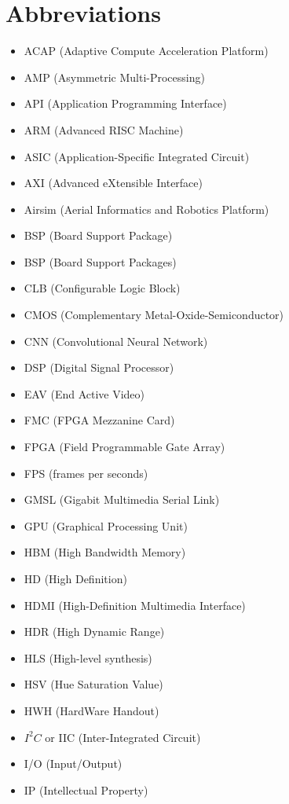 \chapter{Abbreviations}
\begin{multicols}{2}

\begin{itemize}
\item ACAP (Adaptive Compute Acceleration Platform)
\item AMP (Asymmetric Multi-Processing)
\item API (Application Programming Interface)
\item ARM (Advanced RISC Machine)
\item ASIC (Application-Specific Integrated Circuit)
\item AXI (Advanced eXtensible Interface)
\item Airsim (Aerial Informatics and Robotics Platform)
\item BSP (Board Support Package)
\item BSP (Board Support Packages)
\item CLB (Configurable Logic Block)
\item CMOS (Complementary Metal-Oxide-Semiconductor)
\item CNN (Convolutional Neural Network)
\item DSP (Digital Signal Processor)
\item EAV (End Active Video)
\item FMC (FPGA Mezzanine Card)
\item FPGA (Field Programmable Gate Array)
\item FPS (frames per seconds)
\item GMSL (Gigabit Multimedia Serial Link)
\item GPU (Graphical Processing Unit)
\item HBM (High Bandwidth Memory)
\item HD (High Definition)
\item HDMI (High-Definition Multimedia Interface)
\item HDR (High Dynamic Range)
\item HLS (High-level synthesis)
\item HSV (Hue Saturation Value)
\item HWH (HardWare Handout)
\item $I^2C$ or IIC (Inter-Integrated Circuit)
\item I/O (Input/Output)
\item IP (Intellectual Property)

\end{itemize}
\end{multicols}
